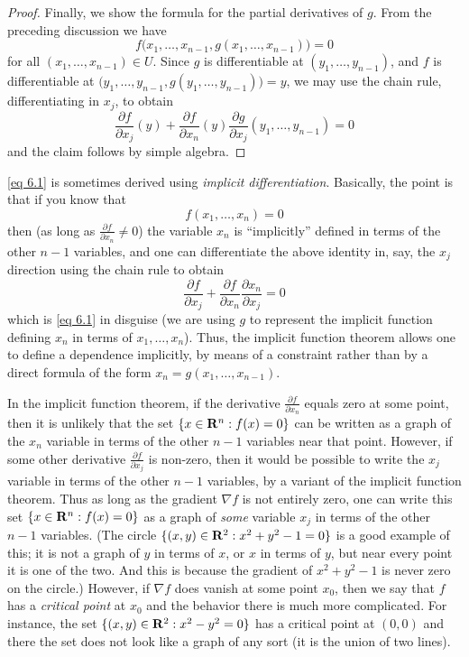 \begin{proof}
  Finally, we show the formula for the partial derivatives of \(g\).
  From the preceding discussion we have
  \[
    f\big(x_1, \dots, x_{n - 1}, g(x_1, \dots, x_{n - 1})\big) = 0
  \]
  for all \((x_1, \dots, x_{n - 1}) \in U\).
  Since \(g\) is differentiable at \((y_1, \dots, y_{n - 1})\), and \(f\) is differentiable at \(\big(y_1, \dots, y_{n - 1}, g(y_1, \dots, y_{n - 1})\big) = y\), we may use the chain rule, differentiating in \(x_j\), to obtain
  \[
    \frac{\partial f}{\partial x_j}(y) + \frac{\partial f}{\partial x_n}(y) \frac{\partial g}{\partial x_j}(y_1, \dots, y_{n - 1}) = 0
  \]
  and the claim follows by simple algebra.
\end{proof}

\begin{remark}\label{6.8.2}
  \cref{eq 6.1} is sometimes derived using \emph{implicit differentiation}.
  Basically, the point is that if you know that
  \[
    f(x_1, \dots, x_n) = 0
  \]
  then (as long as \(\frac{\partial f}{\partial x_n} \neq 0\)) the variable \(x_n\) is ``implicitly'' defined in terms of the other \(n - 1\) variables, and one can differentiate the above identity in, say, the \(x_j\) direction using the chain rule to obtain
  \[
    \frac{\partial f}{\partial x_j} + \frac{\partial f}{\partial x_n} \frac{\partial x_n}{\partial x_j} = 0
  \]
  which is \cref{eq 6.1} in disguise
  (we are using \(g\) to represent the implicit function defining \(x_n\) in terms of \(x_1, \dots, x_n\)).
  Thus, the implicit function theorem allows one to define a dependence implicitly, by means of a constraint rather than by a direct formula of the form \(x_n = g(x_1, \dots, x_{n - 1})\).
\end{remark}

\begin{note}
  In the implicit function theorem, if the derivative \(\frac{\partial f}{\partial x_n}\) equals zero at some point, then it is unlikely that the set \(\{x \in \mathbf{R}^n : f(x) = 0\}\) can be written as a graph of the \(x_n\) variable in terms of the other \(n - 1\) variables near that point.
  However, if some other derivative \(\frac{\partial f}{\partial x_j}\) is non-zero, then it would be possible to write the \(x_j\) variable in terms of the other \(n - 1\) variables, by a variant of the implicit function theorem.
  Thus as long as the gradient \(\nabla f\) is not entirely zero, one can write this set \(\{x \in \mathbf{R}^n : f(x) = 0\}\) as a graph of \emph{some} variable \(x_j\) in terms of the other \(n - 1\) variables.
  (The circle \(\{(x, y) \in \mathbf{R}^2 : x^2 + y^2 - 1 = 0\}\) is a good example of this;
  it is not a graph of \(y\) in terms of \(x\), or \(x\) in terms of \(y\), but near every point it is one of the two.
  And this is because the gradient of \(x^2 + y^2 - 1\) is never zero on the circle.)
  However, if \(\nabla f\) does vanish at some point \(x_0\), then we say that \(f\) has a \emph{critical point} at \(x_0\) and the behavior there is much more complicated.
  For instance, the set \(\{(x, y) \in \mathbf{R}^2 : x^2 - y^2 = 0\}\) has a critical point at \((0, 0)\) and there the set does not look like a graph of any sort
  (it is the union of two lines).
\end{note}

